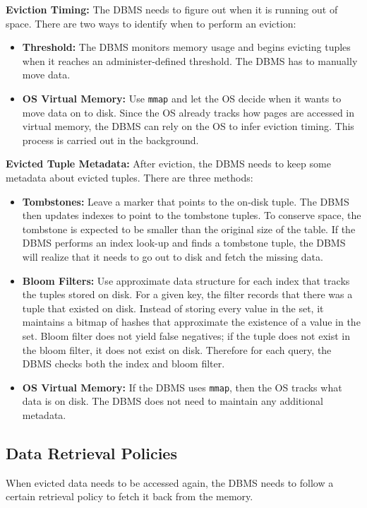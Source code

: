 \documentclass[11pt]{article}
\begin{document}
\textbf{Eviction Timing:} The DBMS needs to figure out when it is running out of space. There are two ways to identify when to perform an eviction:
\begin{itemize}
    \item \textbf{Threshold:} The DBMS monitors memory usage and begins evicting tuples when it reaches an administer-defined threshold. The DBMS has to manually move data.
    \item \textbf{OS Virtual Memory:} Use \texttt{mmap} and let the OS decide when it wants to move data on to disk. Since the OS already tracks how pages are accessed in virtual memory, the DBMS can rely on the OS to infer eviction timing. This process is carried out in the background.
\end{itemize}

\textbf{Evicted Tuple Metadata:} After eviction, the DBMS needs to keep some metadata about evicted tuples. There are three methods:
\begin{itemize}
    \item \textbf{Tombstones:} Leave a marker that points to the on-disk tuple. The DBMS then updates indexes to point to the tombstone tuples. To conserve space, the tombstone is expected to be smaller than the original size of the table. If the DBMS performs an index look-up and finds a tombstone tuple, the DBMS will realize that it needs to go out to disk and fetch the missing data.
    \item \textbf{Bloom Filters:} Use approximate data structure for each index that tracks the tuples stored on disk. For a given key, the filter records that there was a tuple that existed on disk. Instead of storing every value in the set, it maintains a bitmap of hashes that approximate the existence of a value in the set. Bloom filter does not yield false negatives; if the tuple does not exist in the bloom filter, it does not exist on disk. Therefore for each query, the DBMS checks both the index and bloom filter.
    \item \textbf{OS Virtual Memory:} If the DBMS uses \texttt{mmap}, then the OS tracks what data is on disk. The DBMS does not need to maintain any additional metadata.
\end{itemize}

\subsection*{Data Retrieval Policies}
When evicted data needs to be accessed again, the DBMS needs to follow a certain retrieval policy to fetch it back from the memory.
\end{document}
